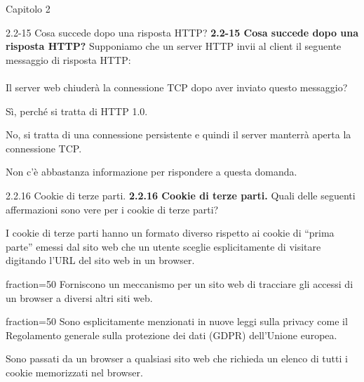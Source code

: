 \documentclass[11pt]{article}
\begin{document}
\begin{quiz}{Capitolo 2}
\begin{multi}[points=1,shuffle]{2.2-15 Cosa succede dopo una risposta HTTP?}
\textbf{2.2-15 Cosa succede dopo una risposta HTTP?} 
Supponiamo che un server HTTP invii al client il seguente messaggio di risposta HTTP: \\

\\

Il server web chiuderà la connessione TCP dopo aver inviato questo messaggio?
\item* Sì, perché si tratta di HTTP 1.0.
\item No, si tratta di una connessione persistente e quindi il server manterrà aperta la connessione TCP.
\item Non c'è abbastanza informazione per rispondere a questa domanda.
\end{multi}
    
\begin{multi}[points=1,shuffle,multiple]{2.2.16 Cookie di terze parti.}
\textbf{2.2.16 Cookie di terze parti.} 
Quali delle seguenti affermazioni sono vere per i cookie di terze parti?

\item I cookie di terze parti hanno un formato diverso rispetto ai cookie di ``prima parte'' emessi dal sito web che un utente sceglie esplicitamente di visitare digitando l'URL del sito web in un browser.
\item[fraction=50] Forniscono un meccanismo per un sito web di tracciare gli accessi di un browser a diversi altri siti web.
\item[fraction=50] Sono esplicitamente menzionati in nuove leggi sulla privacy come il Regolamento generale sulla protezione dei dati (GDPR) dell'Unione europea.
\item Sono passati da un browser a qualsiasi sito web che richieda un elenco di tutti i cookie memorizzati nel browser.
\end{multi}


\end{quiz}
\end{document}
